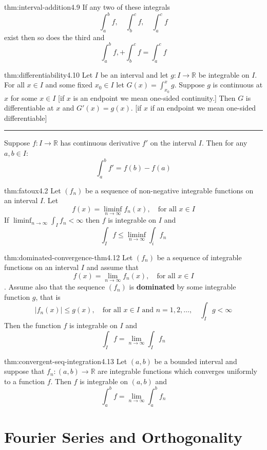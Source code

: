 \documentclass[landscape, 8pt]{extarticle}
\begin{document}
\begin{multicols}{3}
\begin{thm}{thm:interval-addition}{4.9}
	If any two of these integrals
	\[\int_{a}^{b} f, \quad \int_{b}^{c} f, \quad \int_{a}^{c} f\]
	exist then so does the third and
	\[\int_{a}^{b} f, + \int_{b}^{c} f = \int_{a}^{c} f\]
\end{thm}

\begin{thm}{thm:differentiability}{4.10}
	Let $I$ be an interval and let $g : I \to \mathbb{R}$ be integrable on $I$. For all $x\in I$ and some fixed $x_{0}\in I$ let $G(x) = \int_{x_{0}}^{x}g$. Suppose $g$ is continuous at $x$ for some $x\in I$ [if $x$ is an endpoint we mean one-sided continuity.] Then $G$ is differentiable at $x$ and $G'(x) = g(x)$. [if $x$ if an endpoint we mean one-sided differentiable]

	\noindent\rule{\textwidth}{0.2pt}
	Suppose $f : I \to \mathbb{R}$ has continuous derivative $f'$ on the interval $I$. Then for any $a, b\in I$:
	\[\int_{a}^{b} f' = f(b) - f(a) \]
\end{thm}

\begin{lma}{thm:fatoux}{4.2}
	Let $(f_{n})$ be a sequence of non-negative integrable functions on an interval $I$. Let
	\[f(x) = \liminf_{n\to \infty} f_{n}(x),\quad\text{for all $x\in I$}\]
	If $\liminf_{n\to \infty}\int_{I} f_{n} < \infty$ then $f$ is integrable on $I$ and
	\[\int_{I} f \le \liminf_{n\to \infty}\int_{i} f_{n}\]
\end{lma}

\begin{thm}{thm:dominated-convergence-thm}{4.12}
	Let $(f_{n})$ be a sequence of integrable functions on an interval $I$ and assume that
	\[f(x) = \lim_{n\to \infty} f_{n}(x), \quad \text{for all $x\in I$}\].
	Assume also that the sequence $(f_{n})$ is \textbf{dominated} by some integrable function $g$, that is
	\[\lvert f_{n}(x) \rvert \le g(x),\quad \text{for all $x\in I$ and $n = 1,2,\dots,$} \quad \int_{I} g < \infty\]
	Then the function $f$ is integrable on $I$ and
	\[\int_{I} f = \lim_{n\to \infty} \int_{I} f_{n}\]
\end{thm}

\begin{thm}[]{thm:convergent-seq-integration}{4.13}
	Let $(a, b)$ be a bounded interval and suppose that $f_{n} : (a, b) \to \mathbb{R}$ are integrable functions which converges uniformly to a function $f$. Then $f$ is integrable on $(a, b)$ and
	\[\int_{a}^{b} f = \lim_{n\to \infty} \int_{a}^{b} f_{n} \]
\end{thm}

\section{Fourier Series and Orthogonality}



\lipsum[1-12]
\end{multicols}
\end{document}
